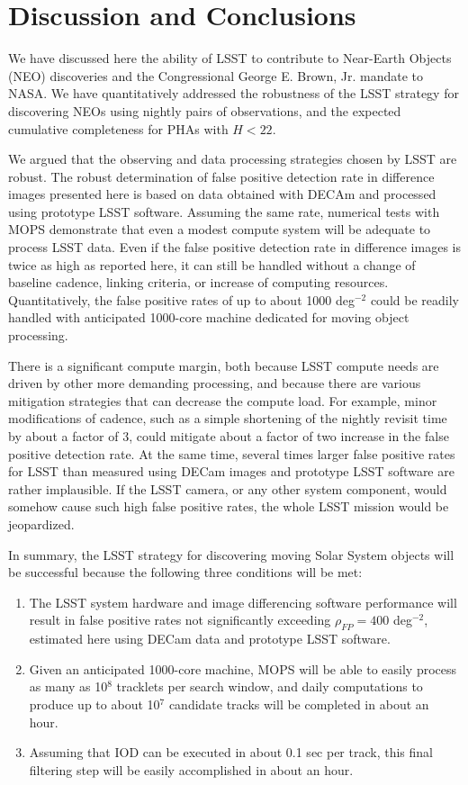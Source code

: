 

\section{Discussion and Conclusions}

We have discussed here the ability of LSST to contribute to Near-Earth Objects (NEO) discoveries and
the Congressional George E. Brown, Jr. mandate to NASA. We have quantitatively addressed
the robustness of the LSST strategy for discovering NEOs using nightly pairs of observations, and
the expected cumulative completeness for PHAs with $H<22$.

We argued that the observing and data processing strategies chosen by LSST are robust. The
robust determination of false positive detection rate in difference images presented here is based
on data obtained with DECAm and processed using prototype LSST software. Assuming the same rate,
numerical tests with MOPS demonstrate that even a modest compute system will be adequate to
process LSST data. Even if the false positive detection rate in difference images is twice as high as
reported here, it can still be handled without a change of baseline cadence, linking criteria, or
increase of computing resources. Quantitatively, the false positive rates of up to about
1000 deg$^{-2}$ could be readily handled with anticipated 1000-core machine dedicated for
moving object processing.

There is a significant compute margin, both because LSST compute needs are driven by other more
demanding processing, and because there are various mitigation strategies that can decrease the
compute load. For example, minor modifications of cadence, such as a simple shortening
of the nightly revisit time by about a factor of 3, could mitigate about a factor of two increase in
the false positive detection rate. At the same time, several times larger false positive rates for LSST
than measured using DECam images and prototype LSST software are rather implausible. If the
LSST camera, or any other system component, would somehow cause such high false positive rates,
the whole LSST mission would be jeopardized.

In summary, the LSST strategy for discovering moving Solar System objects will be successful
because the following three conditions will be met:
\begin{enumerate}
\item The LSST system hardware and image differencing software performance will result in false positive
          rates not significantly exceeding $\rho_{FP} =  400$ deg$^{-2}$, estimated here using DECam data
          and prototype LSST software.
\item Given an anticipated 1000-core machine, MOPS will be able to easily process as many as
         10$^8$ tracklets per search window, and daily computations to produce up to about 10$^7$
         candidate tracks will be completed in about an hour.
\item Assuming that IOD can be executed in about 0.1 sec per track, this final filtering step will
         be easily accomplished in about an hour.
\end{enumerate}


